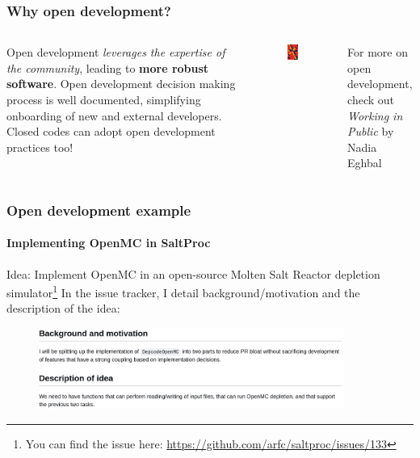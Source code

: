 \begin{frame}
  \frametitle{Why open development?} 
  \begin{columns}

      \column[t]{5cm}
      Open development {\it leverages the expertise of the community}, leading to {\bf more robust software}.
      \newline
      \newline
      Open development decision making process is well documented,  simplifying onboarding of new and external developers.
      \newline
      \newline
      Closed codes can adopt open development practices too!

      \column[t]{5cm}
      \begin{figure}[htpb]
          \centering
          \includegraphics[width=2cm]{images/working-in-public.png}
      \end{figure}
      For more on open development, check out {\it Working in Public} by Nadia Eghbal \cite{eghbal_working_2020}

      
  \end{columns}
\end{frame}

\begin{frame}[fragile]
    \frametitle{Open development example}
    \framesubtitle{Implementing OpenMC in SaltProc}

    Idea: Implement OpenMC in an open-source Molten Salt Reactor depletion simulator\footnote{You can find the issue here: \url{https://github.com/arfc/saltproc/issues/133}} 
    \newline
    \newline
    In the issue tracker, I detail background/motivation and the description of the idea:


    \vspace{0.5cm}
    \begin{figure}[htpb]
        \centering
        \includegraphics[width=10cm]{images/open-dev-ex1.png}
    \end{figure}

    
\end{frame}

